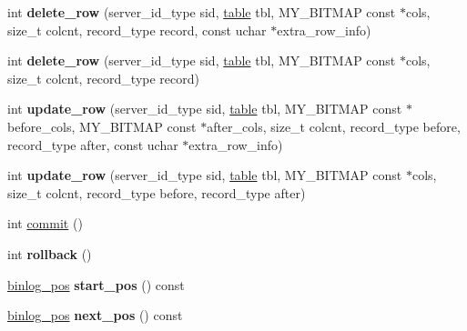 \begin{DoxyCompactItemize}
\item 
\mbox{\label{classinjector_1_1transaction_a54d2e9d704a63cb5272c7a143ac1f950}} 
int {\bfseries delete\+\_\+row} (server\+\_\+id\+\_\+type sid, \mbox{\hyperlink{classinjector_1_1transaction_1_1table}{table}} tbl, M\+Y\+\_\+\+B\+I\+T\+M\+AP const $\ast$cols, size\+\_\+t colcnt, record\+\_\+type record, const uchar $\ast$extra\+\_\+row\+\_\+info)
\item 
\mbox{\label{classinjector_1_1transaction_a02f75dc0ec6bf4692abf3b57817b53c1}} 
int {\bfseries delete\+\_\+row} (server\+\_\+id\+\_\+type sid, \mbox{\hyperlink{classinjector_1_1transaction_1_1table}{table}} tbl, M\+Y\+\_\+\+B\+I\+T\+M\+AP const $\ast$cols, size\+\_\+t colcnt, record\+\_\+type record)
\item 
\mbox{\label{classinjector_1_1transaction_ac95e0011e2698ff97d924f1d1efbcf34}} 
int {\bfseries update\+\_\+row} (server\+\_\+id\+\_\+type sid, \mbox{\hyperlink{classinjector_1_1transaction_1_1table}{table}} tbl, M\+Y\+\_\+\+B\+I\+T\+M\+AP const $\ast$before\+\_\+cols, M\+Y\+\_\+\+B\+I\+T\+M\+AP const $\ast$after\+\_\+cols, size\+\_\+t colcnt, record\+\_\+type before, record\+\_\+type after, const uchar $\ast$extra\+\_\+row\+\_\+info)
\item 
\mbox{\label{classinjector_1_1transaction_a701a78ef792e93fe80338e33a7128fc1}} 
int {\bfseries update\+\_\+row} (server\+\_\+id\+\_\+type sid, \mbox{\hyperlink{classinjector_1_1transaction_1_1table}{table}} tbl, M\+Y\+\_\+\+B\+I\+T\+M\+AP const $\ast$cols, size\+\_\+t colcnt, record\+\_\+type before, record\+\_\+type after)
\item 
int \mbox{\hyperlink{classinjector_1_1transaction_a83b7faf4da3c9450ea2feed25565a308}{commit}} ()
\item 
\mbox{\label{classinjector_1_1transaction_ae028734fb53a794ec7e1155fdcb3a285}} 
int {\bfseries rollback} ()
\item 
\mbox{\label{classinjector_1_1transaction_abb05c6c7969efd192d27bf6b9e324c39}} 
\mbox{\hyperlink{classinjector_1_1transaction_1_1binlog__pos}{binlog\+\_\+pos}} {\bfseries start\+\_\+pos} () const
\item 
\mbox{\label{classinjector_1_1transaction_a71fbf91b3e192c093e8b15b68b7fe0f3}} 
\mbox{\hyperlink{classinjector_1_1transaction_1_1binlog__pos}{binlog\+\_\+pos}} {\bfseries next\+\_\+pos} () const
\end{DoxyCompactItemize}
